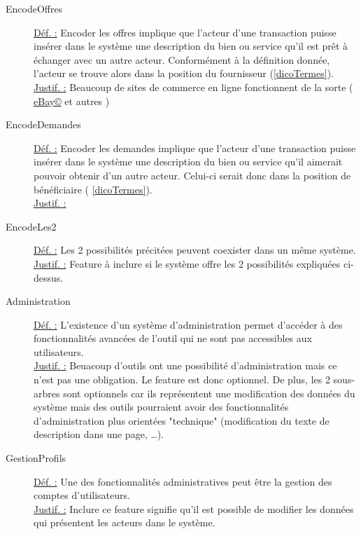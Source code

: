 \begin{description}
\item [EncodeOffres]
\underline{Déf. :}  Encoder les offres implique que l'acteur d'une transaction puisse insérer dans le système une description du bien ou service qu'il est prêt à échanger avec un autre acteur.  Conformément à la définition donnée,  l'acteur se trouve alors dans la position du fournisseur (\ref{dicoTermes}).
\\ \underline{Justif. :}  Beaucoup de sites de commerce en ligne fonctionnent de la sorte ( \href{http://www.befr.ebay.be/}{eBay\copyright} et autres )
\newline

\item [EncodeDemandes]
\underline{Déf. :}  Encoder les demandes implique que l'acteur d'une transaction puisse insérer dans le système une description du bien ou service qu'il aimerait pouvoir obtenir d'un autre acteur.   Celui-ci serait donc dans la position de bénéficiaire ( \ref{dicoTermes}).
\\ \underline{Justif. :}  
\newline

\item [EncodeLes2]
\underline{Déf. :}  Les 2 possibilités précitées peuvent coexister dans un même système.
\\ \underline{Justif. :}  Feature à inclure si le système offre les 2 possibilités expliquées ci-dessus.
\newline

\begin{center}
\end{center}

\item [Administration]
\underline{Déf. :}  L'existence d'un système d'administration permet d'accéder à des fonctionnalités avancées de l'outil qui ne sont pas accessibles aux utilisateurs.
\\ \underline{Justif. :}  Beuacoup d'outils ont une possibilité d'administration mais ce n'est pas une obligation.  Le feature est donc optionnel.  De plus,  les 2 sous-arbres sont optionnels car ils représentent une modification des données du système mais des outils pourraient avoir des fonctionnalités d'administration plus orientées "technique" (modification du texte de description dans une page, \dots).
\newline

\item [GestionProfils]
\underline{Déf. :}  Une des fonctionnalités administratives peut être la gestion des comptes d'utilisateurs.
\\ \underline{Justif. :}  Inclure ce feature signifie qu'il est possible de modifier les données qui présentent les acteurs dans le système.
\newline


\end{description}
